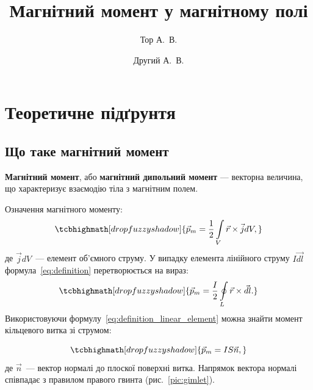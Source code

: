 \documentclass{LabWorkTemplate}
\title{Магнітний момент у магнітному полі}
\author{Тор А.~В.}{}
\author{Другий А.~В.}{}
\begin{document}
\writedatatofile{\jobname}
\maketitle


\section{Теоретичне підґрунтя}
\subsection{Що таке магнітний момент}

\textbf{Магнітний момент}, або \textbf{магнітний дипольний момент} --- векторна величина, що характеризує взаємодію тіла з магнітним полем.

Означення магнітного моменту:
\begin{equation}\label{eq:definition}
	\tcbhighmath[drop fuzzy shadow]{
	\vec{p}_m = \frac12 \int\limits_V \vec{r} \times \vec{j} dV,
	}
\end{equation}
де $\vec{j} dV$~--- елемент об'ємного струму. У випадку елемента лінійного струму $I\vec{dl}$ формула~\eqref{eq:definition} перетворюється на вираз:
\begin{equation}\label{eq:definition_linear_element}
	\tcbhighmath[drop fuzzy shadow]{
	\vec{p}_m = \frac{I}{2} \oint\limits_L \vec{r} \times \vec{dl}.
	}
\end{equation}
Використовуючи формулу~\eqref{eq:definition_linear_element} можна знайти момент кільцевого витка зі струмом:

\begin{equation}\label{eq:circuit}
	\tcbhighmath[drop fuzzy shadow]{
	\vec{p}_m = IS\vec{n},
	}
\end{equation}
де $\vec{n}$~--- вектор нормалі до плоскої поверхні витка. Напрямок вектора нормалі співпадає з правилом правого гвинта (рис.~\ref{pic:gimlet}).
\end{document}
